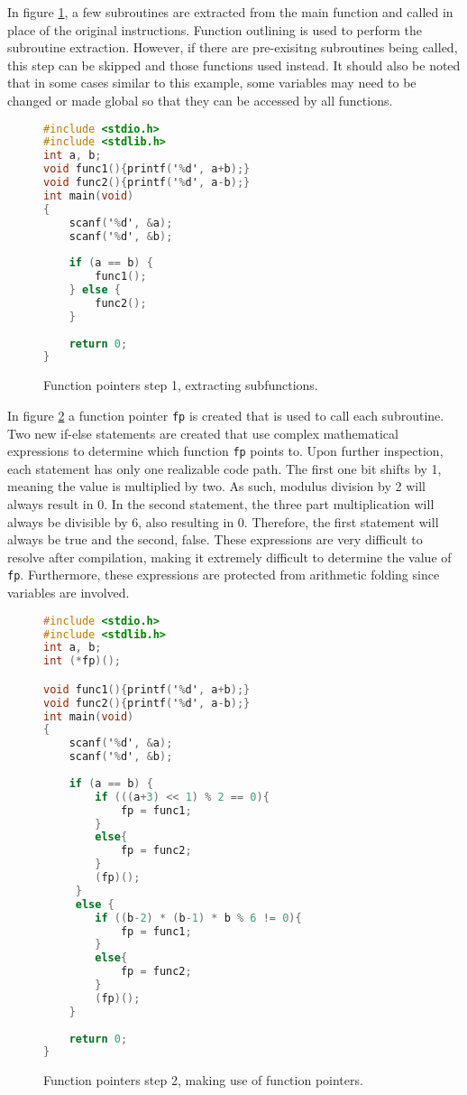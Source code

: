 \documentclass[conference]{IEEEtran}
\begin{document}
In figure \ref{fig:func-pointer-1}, a few subroutines are extracted from the main function and called in place of the original instructions. Function outlining is used to perform the subroutine extraction. However, if there are pre-exisitng subroutines being called, this step can be skipped and those functions used instead. It should also be noted that in some cases similar to this example, some variables may need to be changed or made global so that they can be accessed by all functions.

\begin{figure}[h]
\begin{lstlisting}[language=C,basicstyle=\footnotesize]
#include <stdio.h>
#include <stdlib.h> 
int a, b;
void func1(){printf('%d', a+b);}
void func2(){printf('%d', a-b);}
int main(void)
{
	scanf('%d', &a);
	scanf('%d', &b);
	
	if (a == b) {
	    func1();
	} else {
	    func2();
	}
	
	return 0;
}
\end{lstlisting}
\caption{Function pointers step 1, extracting subfunctions.}
\label{fig:func-pointer-1}
\end{figure}

In figure \ref{fig:func-pointer-2} a function pointer \texttt{fp} is created that is used to call each subroutine. Two new if-else statements are created that use complex mathematical expressions to determine which function \texttt{fp} points to. Upon further inspection, each statement has only one realizable code path. The first one bit shifts by 1, meaning the value is multiplied by two. As such, modulus division by 2 will always result in 0. In the second statement, the three part multiplication will always be divisible by 6, also resulting in 0. Therefore, the first statement will always be true and the second, false. These expressions are very difficult to resolve after compilation, making it extremely difficult to determine the value of \texttt{fp}. Furthermore, these expressions are protected from arithmetic folding since variables are involved.

\begin{figure}[h]
\begin{lstlisting}[language=C,basicstyle=\footnotesize]
#include <stdio.h>
#include <stdlib.h> 
int a, b;
int (*fp)();

void func1(){printf('%d', a+b);}
void func2(){printf('%d', a-b);}
int main(void)
{
	scanf('%d', &a);
	scanf('%d', &b);
	
	if (a == b) {
	    if (((a+3) << 1) % 2 == 0){
	        fp = func1;
	    }
	    else{
	        fp = func2;
	    }
	    (fp)();
	 } 
	 else {
	    if ((b-2) * (b-1) * b % 6 != 0){
	        fp = func1;
	    }
	    else{
	        fp = func2;
	    }
	    (fp)();
	}
	
	return 0;
}
\end{lstlisting}
\caption{Function pointers step 2, making use of function pointers.}
\label{fig:func-pointer-2}
\end{figure}
\end{document}
